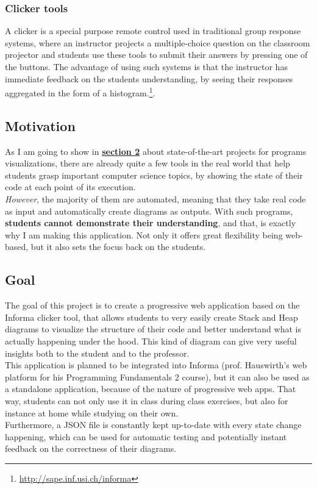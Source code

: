 \documentclass[]{usiinfbachelorproject}
\begin{document}
\vspace{\fill}
\pagebreak
 
\subsubsection{Clicker tools}
 
A clicker is a special purpose remote control used in traditional group response systems, where an instructor projects a multiple-choice question on the classroom projector and students use these tools to submit their answers by pressing one of the buttons. The advantage of using such systems is that the instructor has immediate feedback on the students understanding, by seeing their responses aggregated in the form of a histogram.\footnote{\url{http://sape.inf.usi.ch/informa}}.
 
\subsection{Motivation}

As I am going to show in \hyperref[state]{\textbf{section 2}} about state-of-the-art projects for programs visualizations, there are already quite a few tools in the real world that help students grasp important computer science topics, by showing the state of their code at each point of its execution.\\
\emph{However}, the majority of them are automated, meaning that they take real code as input and automatically create diagrams as outputs. With such programs, \textbf{students cannot demonstrate their understanding}, and that, is exactly why I am making this application. Not only it offers great flexibility being web-based, but it also sets the focus back on the students.

\subsection{Goal} \label{goal}

The goal of this project is to create a progressive web application based on the Informa clicker tool, that allows students to very easily create Stack and Heap diagrams to visualize the structure of their code and better understand what is actually happening under the hood. This kind of diagram can give very useful insights both to the student and to the professor.\\ This application is planned to be integrated into Informa (prof. Hauswirth's web platform for his Programming Fundamentals 2 course), but it can also be used as a standalone application, because of the nature of progressive web apps. That way, students can not only use it in class during class exercises, but also for instance at home while studying on their own.\\
Furthermore, a JSON file is constantly kept up-to-date with every state change happening, which can be used for automatic testing and potentially instant feedback on the correctness of their diagrams.
\end{document}
